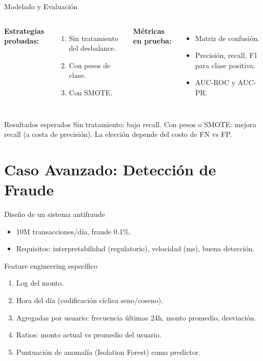 \documentclass[aspectratio=169, 10pt, xcolor=table]{beamer}
\begin{document}
\begin{frame}{Modelado y Evaluación}
    \begin{columns}[t]
        \textbf{Estrategias probadas:}
        \begin{enumerate}
            \item Sin tratamiento del desbalance.
            \item Con pesos de clase.
            \item Con SMOTE.
        \end{enumerate}
        \textbf{Métricas en prueba:}
        \begin{itemize}
            \item Matriz de confusión.
            \item Precisión, recall, F1 para clase positiva.
            \item AUC-ROC y AUC-PR.
        \end{itemize}
    \end{columns}
    \vspace{0.3cm}
    \begin{exampleblock}{Resultados esperados}
        Sin tratamiento: bajo recall. Con pesos o SMOTE: mejora recall (a costa de precisión). La elección depende del costo de FN vs FP.
    \end{exampleblock}
\end{frame}

\section{Caso Avanzado: Detección de Fraude}

\begin{frame}{Diseño de un sistema antifraude}
    \begin{itemize}
        \item 10M transacciones/día, fraude 0.1\%.
        \item Requisitos: interpretabilidad (regulatorio), velocidad (ms), buena detección.
    \end{itemize}
    \begin{block}{Feature engineering específico}
        \begin{enumerate}
            \item Log del monto.
            \item Hora del día (codificación cíclica seno/coseno).
            \item Agregadas por usuario: frecuencia últimas 24h, monto promedio, desviación.
            \item Ratios: monto actual vs promedio del usuario.
            \item Puntuación de anomalía (Isolation Forest) como predictor.
        \end{enumerate}
    \end{block}
\end{frame}
\end{document}
